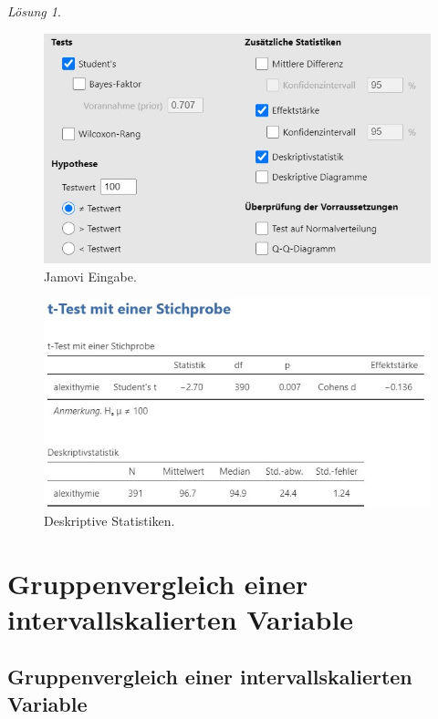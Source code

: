 \documentclass[
]{book}
\theoremstyle{definition}
\theoremstyle{definition}
\theoremstyle{definition}
\theoremstyle{definition}
\theoremstyle{remark}
\newtheorem*{solution}{Lösung}
\begin{document}
\begin{solution}
\leavevmode

\begin{figure}
\includegraphics[width=1\linewidth]{figures/05-exr-alexithymie-jmv-input} \caption{Jamovi Eingabe.}\label{fig:sol-alexithymie-input}
\end{figure}

\begin{figure}
\includegraphics[width=1\linewidth]{figures/05-exr-alexithymie-jmv-output} \caption{Deskriptive Statistiken.}\label{fig:sol-alexithymie-output}
\end{figure}

\end{solution}

\part{Gruppenvergleich einer intervallskalierten Variable}\label{part-gruppenvergleich-einer-intervallskalierten-variable}

\chapter{Gruppenvergleich einer intervallskalierten Variable}\label{gruppenvergleich-einer-intervallskalierten-variable}
\end{document}
